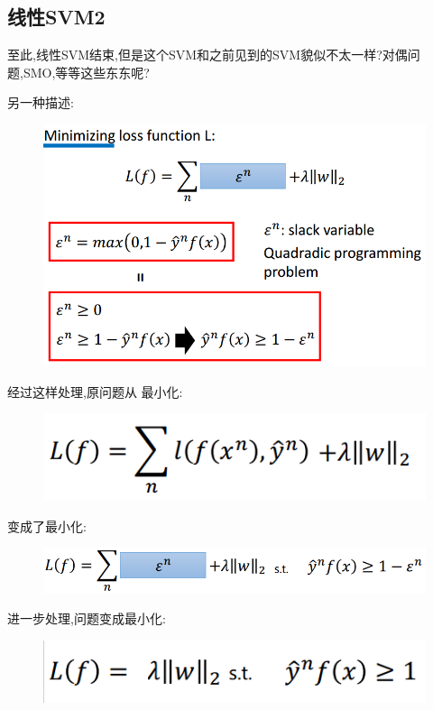 \documentclass[UTF8,a4paper]{ctexart}
\begin{document}
        \subsection{线性SVM2}
        {\color{red} 至此,线性SVM结束,但是这个SVM和之前见到的SVM貌似不太一样?对偶问题,SMO,等等这些东东呢?}

        另一种描述:
        \begin{figure}[H]
            \centering
            \includegraphics[scale = 0.3]{assets/ML_e1a0b.png}
        \end{figure}

        经过这样处理,原问题从
        最小化:
        \begin{figure}[H]
            \centering
            \includegraphics[scale = 0.3]{assets/ML_5215d.png}
        \end{figure}

        变成了最小化:
        \begin{figure}[H]
            \centering
            \includegraphics[scale = 0.3]{assets/ML_a74a0.png}
        \end{figure}

        进一步处理,问题变成最小化:
        \begin{figure}[H]
            \centering
            \includegraphics[scale = 0.3]{assets/ML_371e4.png}
        \end{figure}
\end{document}
